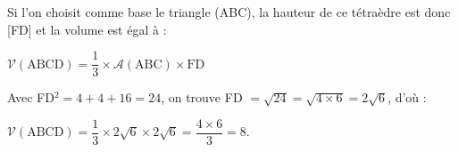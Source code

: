 \begin{enumerate}
\begin{enumerate}
Si l'on choisit comme base le triangle (ABC), la hauteur de ce tétraèdre est donc [FD] et la volume est égal à :

$\mathcal{V}(\text{ABCD}) = \dfrac13 \times \mathcal{A}(\text{ABC}) \times \text{FD}$

Avec FD$^2 = 4 + 4 + 16 = 24$, on trouve FD $ = \sqrt{24} = \sqrt{4 \times 6} = 2\sqrt{6}$, d'où :

$\mathcal{V}(\text{ABCD}) = \dfrac13 \times 2 \sqrt{6} \times 2\sqrt{6} = \dfrac{4 \times 6}{3} = 8$.
	\end{enumerate}
\end{enumerate}

\bigskip
